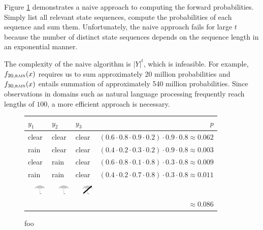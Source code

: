 Figure \ref{fw-naive-prob} demonstrates a naive approach to computing
the forward probabilities. Simply list all relevant state sequences,
compute the probabilities of each sequence and sum
them. Unfortunately, the naive approach fails for large $t$ because
the number of distinct state sequences depends on the sequence length
in an exponential manner.

The complexity of the naive algorithm is $|Y|^t$, which is infeasible.
For example, $f_{20,\textsc{rain}}(x)$ requires us to sum
approximately 20 million probabilities and $f_{30,\textsc{rain}}(x)$
entails summation of approximately 540 million probabilities. Since
observations in domains such as natural language processing frequently
reach lengths of $100$, a more efficient approach is necessary.

\begin{figure}[!ftb]
\begin{center}
\caption{foo}\label{fw-naive-prob}
\begin{tabular}{lllr}
$y_1$ & $y_2$ & $y_3$ & $p$ \\
\hline
{\sc clear} & {\sc clear} & {\sc clear} & $(0.6\cdot0.8\cdot0.9\cdot0.2)\cdot0.9\cdot0.8\approx0.062$\\
{\sc rain}  & {\sc clear} & {\sc clear} & $(0.4\cdot0.2\cdot0.3\cdot0.2)\cdot0.9\cdot0.8\approx0.003$\\
{\sc clear} & {\sc rain}  & {\sc clear} & $(0.6\cdot0.8\cdot0.1\cdot0.8)\cdot0.3\cdot0.8\approx0.009$\\
{\sc rain}  & {\sc rain}  & {\sc clear} & $(0.4\cdot0.2\cdot0.7\cdot0.8)\cdot0.3\cdot0.8\approx0.011$\\
& & & \\
~~\includegraphics[width=0.5cm]{umbrella} & ~~\includegraphics[width=0.5cm]{umbrella} & ~~\includegraphics[width=0.5cm]{no_umbrella} & \\
\hline
        &       & & $\approx0.086$
\end{tabular}
\end{center}
\end{figure}

